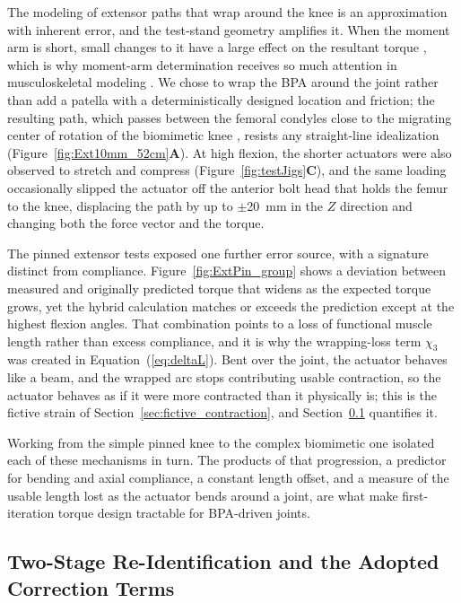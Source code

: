 \documentclass[utf8]{FrontiersinHarvard} %
\begin{document}
The modeling of extensor paths that wrap around the knee is an approximation with inherent error, and the test-stand geometry amplifies it. When the moment arm is short, small changes to it have a large effect on the resultant torque \citep{young_analyzing_2019}, which is why moment-arm determination receives so much attention in musculoskeletal modeling \citep{brand_model_1982, menegaldo_moment_2004, suderman_moving_2012}. We chose to wrap the BPA around the joint rather than add a patella with a deterministically designed location and friction; the resulting path, which passes between the femoral condyles close to the migrating center of rotation of the biomimetic knee \citep{steele_biomimetic_2018}, resists any straight-line idealization (Figure~\ref{fig:Ext10mm_52cm}\textbf{A}). At high flexion, the shorter actuators were also observed to stretch and compress (Figure~\ref{fig:testJigs}\textbf{C}), and the same loading occasionally slipped the actuator off the anterior bolt head that holds the femur to the knee, displacing the path by up to $\pm$\qty{20}{\mm} in the $Z$ direction and changing both the force vector and the torque.

The pinned extensor tests exposed one further error source, with a signature distinct from compliance. Figure~\ref{fig:ExtPin_group} shows a deviation between measured and originally predicted torque that widens as the expected torque grows, yet the hybrid calculation matches or exceeds the prediction except at the highest flexion angles. That combination points to a loss of functional muscle length rather than excess compliance, and it is why the wrapping-loss term $\chi_{3}$ was created in Equation~(\ref{eq:deltaL}). Bent over the joint, the actuator behaves like a beam, and the wrapped arc stops contributing usable contraction, so the actuator behaves as if it were more contracted than it physically is; this is the fictive strain of Section~\ref{sec:fictive_contraction}, and Section~\ref{sec:adopted_identification} quantifies it.

Working from the simple pinned knee to the complex biomimetic one isolated each of these mechanisms in turn. The products of that progression, a predictor for bending and axial compliance, a constant length offset, and a measure of the usable length lost as the actuator bends around a joint, are what make first-iteration torque design tractable for BPA-driven joints.

\subsection{Two-Stage Re-Identification and the Adopted Correction Terms}\label{sec:adopted_identification}
\end{document}
